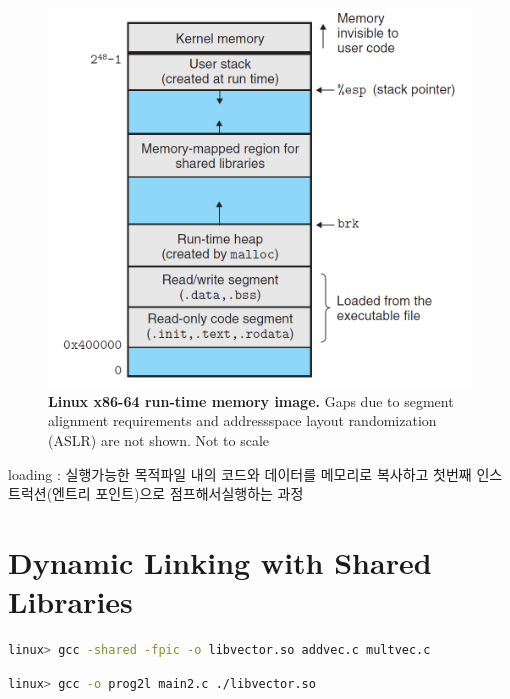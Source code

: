 \begin{figure}[h!]
    \centering
    \includegraphics[scale=0.5]{pic/section7/pic5.png}
    \caption{\textbf{Linux x86-64 run-time memory image.} 
    Gaps due to segment alignment requirements and addressspace layout randomization (ASLR) are not shown. Not to scale}
\end{figure}

loading : 실행가능한 목적파일 내의 코드와 데이터를 메모리로 복사하고 첫번째 인스트럭션(엔트리 포인트)으로 점프해서실행하는 과정


\section{Dynamic Linking with Shared Libraries}

\begin{lstlisting}[language=bash]
linux> gcc -shared -fpic -o libvector.so addvec.c multvec.c
\end{lstlisting}

\begin{lstlisting}[language=bash]
    linux> gcc -o prog2l main2.c ./libvector.so
\end{lstlisting}

